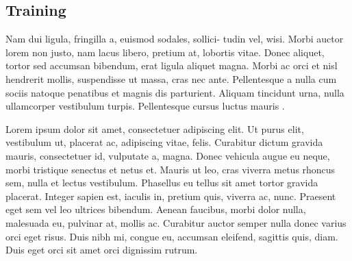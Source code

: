 \subsection{Training}
\label{subsec:training}

Nam dui ligula, fringilla a, euismod sodales, sollici- tudin vel, wisi.
Morbi auctor lorem non justo, nam lacus libero, pretium at, lobortis vitae.
Donec aliquet, tortor sed accumsan bibendum, erat ligula aliquet magna.
Morbi ac orci et nisl hendrerit mollis, suspendisse ut massa, cras nec ante.
Pellentesque a nulla cum sociis natoque penatibus et magnis dis parturient.
Aliquam tincidunt urna, nulla ullamcorper vestibulum turpis.
Pellentesque cursus luctus mauris \cite{kingmaAutoEncodingVariationalBayes2022}.

Lorem ipsum dolor sit amet, consectetuer adipiscing elit.
Ut purus elit, vestibulum ut, placerat ac, adipiscing vitae, felis.
Curabitur dictum gravida mauris, consectetuer id, vulputate a, magna.
Donec vehicula augue eu neque, morbi tristique senectus et netus et.
Mauris ut leo, cras viverra metus rhoncus sem, nulla et lectus vestibulum.
Phasellus eu tellus sit amet tortor gravida placerat.
Integer sapien est, iaculis in, pretium quis, viverra ac, nunc.
Praesent eget sem vel leo ultrices bibendum.
Aenean faucibus, morbi dolor nulla, malesuada eu, pulvinar at, mollis ac.
Curabitur auctor semper nulla donec varius orci eget risus.
Duis nibh mi, congue eu, accumsan eleifend, sagittis quis, diam.
Duis eget orci sit amet orci dignissim rutrum.
